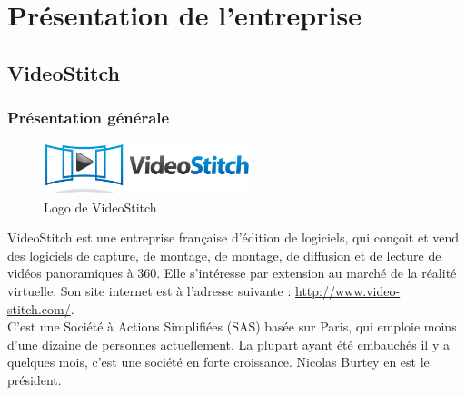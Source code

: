 \chapter{Présentation de l'entreprise}

\section{VideoStitch}
\subsection{Présentation générale}
\begin{figure}
  \centering
  \includegraphics[width=6cm]{images/videostitch.jpg}
  \caption{Logo de VideoStitch}
\end{figure}
VideoStitch est une entreprise française d'édition de logiciels, qui conçoit et 
vend des logiciels de capture, de montage, de montage, de diffusion et de lecture 
de vidéos panoramiques à 360\degree. Elle s'intéresse par extension au marché de 
la réalité virtuelle.
Son site internet est à l'adresse suivante : \url{http://www.video-stitch.com/}.\\
C'est une Société à Actions Simplifiées (SAS) basée sur Paris, qui emploie moins
d'une dizaine de personnes actuellement. La plupart ayant été embauchés il y a 
quelques mois, c'est une société en forte croissance. 
Nicolas Burtey en est le président.

